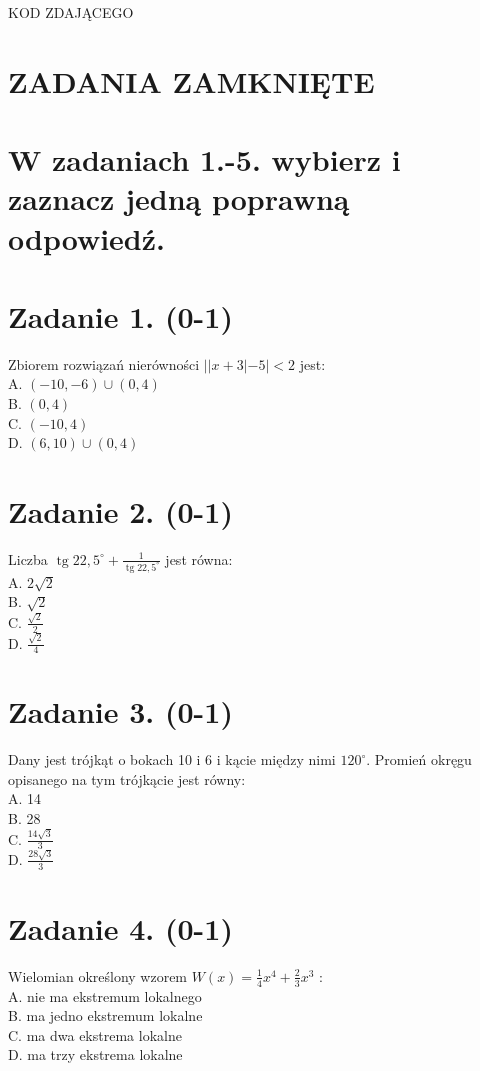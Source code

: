 \documentclass[10pt]{article}
\begin{document}
KOD ZDAJĄCEGO

\section*{ZADANIA ZAMKNIĘTE}
\section*{W zadaniach 1.-5. wybierz i zaznacz jedną poprawną odpowiedź.}
\section*{Zadanie 1. (0-1)}
Zbiorem rozwiązań nierówności \(||x+3|-5|<2\) jest:\\
A. \((-10,-6) \cup(0,4)\)\\
B. \((0,4)\)\\
C. \((-10,4)\)\\
D. \((6,10) \cup(0,4)\)

\section*{Zadanie 2. (0-1)}
Liczba \(\operatorname{tg} 22,5^{\circ}+\frac{1}{\operatorname{tg} 22,5^{\circ}}\) jest równa:\\
A. \(2 \sqrt{2}\)\\
B. \(\sqrt{2}\)\\
C. \(\frac{\sqrt{2}}{2}\)\\
D. \(\frac{\sqrt{2}}{4}\)

\section*{Zadanie 3. (0-1)}
Dany jest trójkąt o bokach 10 i 6 i kącie między nimi \(120^{\circ}\). Promień okręgu opisanego na tym trójkącie jest równy:\\
A. 14\\
B. 28\\
C. \(\frac{14 \sqrt{3}}{3}\)\\
D. \(\frac{28 \sqrt{3}}{3}\)

\section*{Zadanie 4. (0-1)}
Wielomian określony wzorem \(W(x)=\frac{1}{4} x^{4}+\frac{2}{3} x^{3}\) :\\
A. nie ma ekstremum lokalnego\\
B. ma jedno ekstremum lokalne\\
C. ma dwa ekstrema lokalne\\
D. ma trzy ekstrema lokalne
\end{document}
